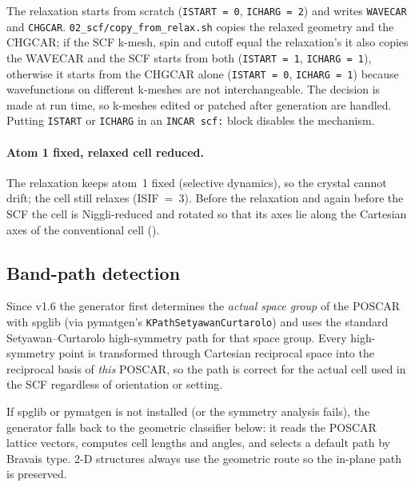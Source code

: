 \documentclass[11pt,a4paper]{scrartcl}
\newcommand{\cmd}[1]{\texttt{\detokenize{#1}}}
\begin{document}
The relaxation starts from scratch (\texttt{ISTART = 0}, \texttt{ICHARG = 2})
and writes \texttt{WAVECAR} and \texttt{CHGCAR}.  \texttt{02\_scf/copy\_from\_relax.sh}
copies the relaxed geometry and the CHGCAR; if the SCF k-mesh, spin and cutoff
equal the relaxation's it also copies the WAVECAR and the SCF starts from both
(\texttt{ISTART = 1}, \texttt{ICHARG = 1}), otherwise it starts from the CHGCAR
alone (\texttt{ISTART = 0}, \texttt{ICHARG = 1}) because wavefunctions on
different k-meshes are not interchangeable.  The decision is made at run time,
so k-meshes edited or patched after generation are handled.  Putting
\texttt{ISTART} or \texttt{ICHARG} in an \texttt{INCAR scf:} block disables the
mechanism.

\paragraph{Atom 1 fixed, relaxed cell reduced.}  The relaxation keeps atom~1 fixed (selective
dynamics), so the crystal cannot drift; the cell still relaxes (ISIF~=~3).  Before the
relaxation and again before the SCF the cell is Niggli-reduced and rotated so that its axes
lie along the Cartesian axes of the conventional cell (\cmd{REDUCE_CELL}).

\subsection{Band-path detection}
\label{app:kpath}

Since v1.6 the generator first determines the \emph{actual space group}
of the POSCAR with spglib (via pymatgen's
\texttt{KPathSetyawanCurtarolo}) and uses the standard
Setyawan--Curtarolo high-symmetry path for that space group.  Every
high-symmetry point is transformed through Cartesian reciprocal space
into the reciprocal basis of \emph{this} POSCAR, so the path is correct
for the actual cell used in the SCF regardless of orientation or
setting.

If spglib or pymatgen is not installed (or the symmetry analysis
fails), the generator falls back to the geometric classifier below: it
reads the POSCAR lattice vectors, computes cell lengths and angles, and
selects a default path by Bravais type.  2-D structures always use the
geometric route so the in-plane path is preserved.
\end{document}
